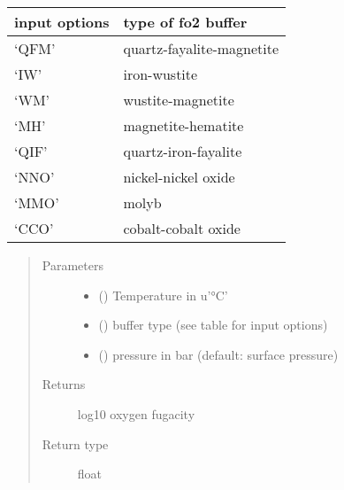 \documentclass[letterpaper,10pt,english]{sphinxmanual}
\begin{document}
\begin{fulllineitems}
\begin{fulllineitems}
\begin{savenotes}\sphinxattablestart
\centering
\begin{tabulary}{\linewidth}[t]{|T|T|}
\hline
\sphinxstyletheadfamily 
input options
&\sphinxstyletheadfamily 
type of fo2 buffer
\\
\hline
‘QFM’
&
quartz-fayalite-magnetite
\\
\hline
‘IW’
&
iron-wustite
\\
\hline
‘WM’
&
wustite-magnetite
\\
\hline
‘MH’
&
magnetite-hematite
\\
\hline
‘QIF’
&
quartz-iron-fayalite
\\
\hline
‘NNO’
&
nickel-nickel oxide
\\
\hline
‘MMO’
&
molyb
\\
\hline
‘CCO’
&
cobalt-cobalt oxide
\\
\hline
\end{tabulary}
\par
\sphinxattableend\end{savenotes}
\begin{quote}\begin{description}
\item[{Parameters}] \leavevmode\begin{itemize}
\item {} 
 (\sphinxstyleliteralemphasis{\sphinxupquote{, }}) \textendash{} Temperature in u’°C’

\item {} 
 () \textendash{} buffer type (see table for input options)

\item {} 
 (\sphinxstyleliteralemphasis{\sphinxupquote{, }}) \textendash{} pressure in bar (default: surface pressure)

\end{itemize}

\item[{Returns}] \leavevmode
log10 oxygen fugacity

\item[{Return type}] \leavevmode
float

\end{description}\end{quote}


\end{fulllineitems}
\end{fulllineitems}
\end{document}
